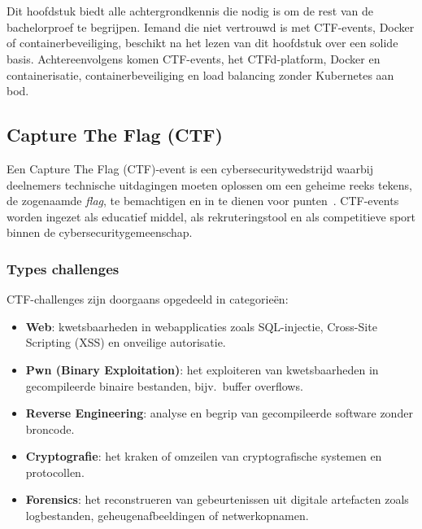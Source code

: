 \chapter{}%
\label{ch:stand-van-zaken}

Dit hoofdstuk biedt alle achtergrondkennis die nodig is om de rest van de bachelorproef te begrijpen. Iemand die niet vertrouwd is met CTF-events, Docker of containerbeveiliging, beschikt na het lezen van dit hoofdstuk over een solide basis. Achtereenvolgens komen CTF-events, het CTFd-platform, Docker en containerisatie, containerbeveiliging en load balancing zonder Kubernetes aan bod.

\section{Capture The Flag (CTF)}%
\label{sec:ctf}

Een Capture The Flag (CTF)-event is een cybersecuritywedstrijd waarbij deelnemers technische uitdagingen moeten oplossen om een geheime reeks tekens, de zogenaamde \textit{flag}, te bemachtigen en in te dienen voor punten~\autocite{Innovirtuoso2025}. CTF-events worden ingezet als educatief middel, als rekruteringstool en als competitieve sport binnen de cybersecuritygemeenschap.

\subsection{Types challenges}

CTF-challenges zijn doorgaans opgedeeld in categorieën:

\begin{itemize}
  \item \textbf{Web}: kwetsbaarheden in webapplicaties zoals SQL-injectie, Cross-Site Scripting (XSS) en onveilige autorisatie.
  \item \textbf{Pwn (Binary Exploitation)}: het exploiteren van kwetsbaarheden in gecompileerde binaire bestanden, bijv.\ buffer overflows.
  \item \textbf{Reverse Engineering}: analyse en begrip van gecompileerde software zonder broncode.
  \item \textbf{Cryptografie}: het kraken of omzeilen van cryptografische systemen en protocollen.
  \item \textbf{Forensics}: het reconstrueren van gebeurtenissen uit digitale artefacten zoals logbestanden, geheugenafbeeldingen of netwerkopnamen.
\end{itemize}

